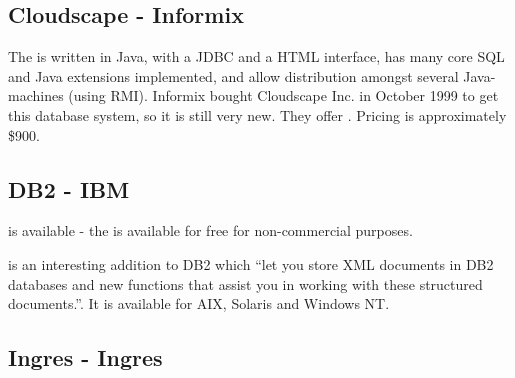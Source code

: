 

\subsection{Cloudscape - Informix}
\label{sec:cloudscape}

The
 is written in Java, with a JDBC and a HTML interface, has
many core SQL and Java extensions implemented, and allow distribution
amongst several Java-machines (using RMI).  Informix bought Cloudscape
Inc. in October 1999 to get this database system, so it is still very
new.  They offer
.  Pricing is approximately \$900.


\subsection{DB2 - IBM}
\label{sec:db2}

is available - the  is available
for free for non-commercial purposes.  

 is an interesting addition to DB2 which ``let you
store XML documents in DB2 databases and new functions that assist you
in working with these structured documents.''.  It is available for
AIX, Solaris and Windows NT. 

  



 
\subsection{Ingres - Ingres}
\label{sec:ingres}

